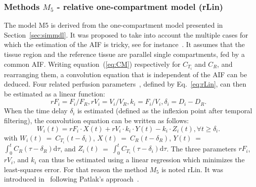 \subsubsection{Methods $M_5$ - relative one-compartment model (rLin)}
The model M5 is derived from the one-compartment model presented in Section~\ref{sec:simmdl}. It was proposed to take into account the multiple cases for which the estimation of the AIF is tricky, see for instance~\cite{Doury2017wn}.
It assumes that the tissue region and the reference tissue are parallel single compartments, fed by a common AIF. 
Writing equation~(\ref{eq:CM}) respectively for $C_{T_i}$ and $C_R$, and rearranging them, a convolution equation that is independent of the AIF can be deduced. Four related perfusion parameters~\cite{Doury2017wn}, defined by Eq.~\ref{eq:rLin}, can then be estimated as a linear function:
\begin{equation}
rF_i = F_i/F_R, rV_i = V_i/V_R, k_i = F_i/V_i, \delta_i = D_i - D_R.
\label{eq:rLin}
\end{equation}
When the time delay $\delta_i$ is estimated (defined as the inflexion point after temporal filtering), the convolution equation can be written as follows:
\begin{equation}
W_i(t)= rF_i \cdot X(t) + rV_i \cdot k_i \cdot Y(t) - k_i \cdot Z_i(t), \forall t \geq \delta_i.
\label{eq:rLin2}
\end{equation} 
 with $W_i(t)$~=~$C_{T_i}(t-\delta_i)$, $X(t)$~=~$C_R(t-\delta_R)$, $Y(t)$~=~$\int_0^t C_R \left(\tau-\delta_R\right)\mathrm d\tau$,
and $Z_i(t)$~=~$\int_0^t C_{T_i} \left(\tau-\delta_i \right)\mathrm d\tau$.
The three parameters $rF_i$, $rV_i$, and $k_i$ can thus be estimated using a linear regression which minimizes the least-squares error. For that reason the method $M_5$ is noted rLin. It was introduced in~\cite{Doury2016fi} following Patlak's approach~\cite{Patlak:1983id}.

